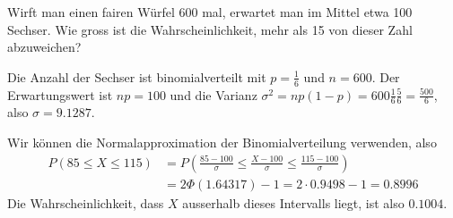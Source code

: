 Wirft man einen fairen Würfel 600 mal, erwartet man im Mittel
etwa 100 Sechser. Wie gross ist die Wahrscheinlichkeit,
mehr als 15 von dieser Zahl abzuweichen?


\begin{loesung}
Die Anzahl der Sechser ist binomialverteilt mit $p=\frac16$
und $n=600$. Der Erwartungswert ist $np=100$ und die
Varianz $\sigma^2=np(1-p)=600\frac16\frac56=\frac{500}6$,
also $\sigma=9.1287$.

Wir können die Normalapproximation der Binomialverteilung verwenden,
also
\begin{align*}
P(85\le X\le 115)
&=
P\left(\frac{85-100}{\sigma}\le\frac{X-100}{\sigma}\le\frac{115-100}{\sigma}\right)
\\
&=
2\Phi(1.64317)-1=2\cdot 0.9498-1=0.8996
\end{align*}
Die Wahrscheinlichkeit, dass $X$ ausserhalb dieses Intervalls liegt,
ist also $0.1004$.
\end{loesung}
